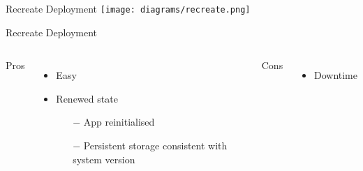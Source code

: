 \documentclass{slide}
\begin{document}

\begin{frame}{Recreate Deployment \cite{deployment-strategies}}
    \vspace{1pt}
    \centering
    \texttt{[image: diagrams/recreate.png]}
\end{frame}

\begin{frame}{Recreate Deployment}
    \vspace{1pt}
    \begin{columns}[t]
      \huge Pros
      {\LARGE
        \begin{itemize}
            \item Easy
            \vspace{2mm}
            \item Renewed state
            \begin{itemize}
                \Large\item[$-$] App reinitialised
	            \vspace{2mm}
                \Large\item[$-$] { Persistent storage consistent with system version\\}
            \end{itemize}
        \end{itemize}
      }
      \huge Cons
      {\LARGE
        \begin{itemize}
            \item Downtime
        \end{itemize}
      }
    \end{columns}
\end{frame}
\end{document}
